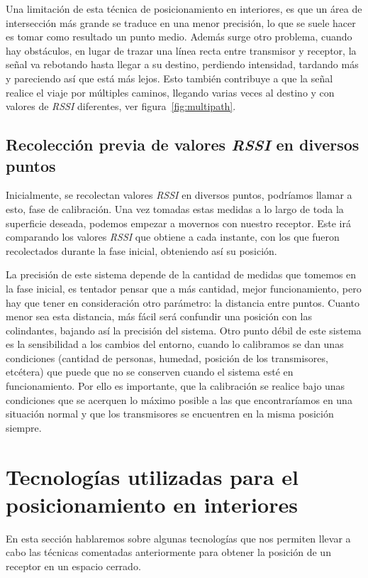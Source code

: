 Una limitación de esta técnica de posicionamiento en interiores, es que un área de intersección más grande se traduce en una menor precisión, lo que se suele hacer es tomar como resultado un punto medio. Además surge otro problema, cuando hay obstáculos, en lugar de trazar una línea recta entre transmisor y receptor, la señal va rebotando hasta llegar a su destino, perdiendo intensidad, tardando más y pareciendo así que está más lejos. Esto también contribuye a que la señal realice el viaje por múltiples caminos, llegando varias veces al destino y con valores de \textit{RSSI} diferentes, ver figura~\ref{fig:multipath}.

\subsection{Recolección previa de valores \textit{RSSI} en diversos puntos}
Inicialmente, se recolectan valores \textit{RSSI} en diversos puntos, podríamos llamar a esto, fase de calibración. Una vez tomadas estas medidas a lo largo de toda la superficie deseada, podemos empezar a movernos con nuestro receptor. Este irá comparando los valores \textit{RSSI} que obtiene a cada instante, con los que fueron recolectados durante la fase inicial, obteniendo así su posición.

La precisión de este sistema depende de la cantidad de medidas que tomemos en la fase inicial, es tentador pensar que a más cantidad, mejor funcionamiento, pero hay que tener en consideración otro parámetro: la distancia entre puntos. Cuanto menor sea esta distancia, más fácil será confundir una posición con las colindantes, bajando así la precisión del sistema. Otro punto débil de este sistema es la sensibilidad a los cambios del entorno, cuando lo calibramos se dan unas condiciones (cantidad de personas, humedad, posición de los transmisores, etcétera) que puede que no se conserven cuando el sistema esté en funcionamiento. Por ello es importante, que la calibración se realice bajo unas condiciones que se acerquen lo máximo posible a las que encontraríamos en una situación normal y que los transmisores se encuentren en la misma posición siempre.


\section{Tecnologías utilizadas para el posicionamiento en interiores}
En esta sección hablaremos sobre algunas tecnologías que nos permiten llevar a cabo las técnicas comentadas anteriormente para obtener la posición de un receptor en un espacio cerrado.

